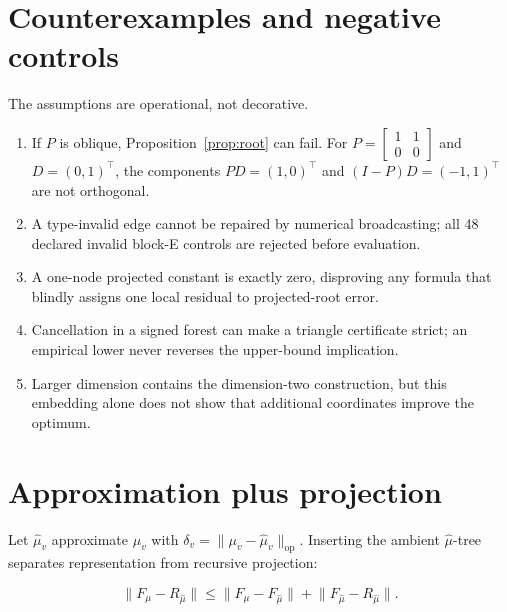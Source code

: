 \documentclass[11pt]{amsart}
\theoremstyle{definition}
\theoremstyle{remark}
\newcommand{\op}{\operatorname{op}}
\newcommand{\norm}[1]{\lVert#1\rVert}
\begin{document}
\section{Counterexamples and negative controls}

The assumptions are operational, not decorative.

\begin{enumerate}[leftmargin=*]
\item If \(P\) is oblique, Proposition~\ref{prop:root} can fail.  For
\(P=\begin{bmatrix}1&1\\0&0\end{bmatrix}\) and \(D=(0,1)^\top\), the
components \(PD=(1,0)^\top\) and \((I-P)D=(-1,1)^\top\) are not orthogonal.
\item A type-invalid edge cannot be repaired by numerical broadcasting; all
48 declared invalid block-E controls are rejected before evaluation.
\item A one-node projected constant is exactly zero, disproving any formula
that blindly assigns one local residual to projected-root error.
\item Cancellation in a signed forest can make a triangle certificate strict;
an empirical lower never reverses the upper-bound implication.
\item Larger dimension contains the dimension-two construction, but this
embedding alone does not show that additional coordinates improve the optimum.
\end{enumerate}

\begin{table}[p]
\centering\small
\caption{Failure and counterexample registry.  Open scientific questions are retained as blockers.}
\label{tab:failures}
\resizebox{.94\textwidth}{!}{}
\end{table}

\section{Approximation plus projection}

Let \(\widehat\mu_v\) approximate \(\mu_v\) with
\(\delta_v=\norm{\mu_v-\widehat\mu_v}_{\op}\).  Inserting the ambient
\(\widehat\mu\)-tree separates representation from recursive projection:

\[
 \norm{F_\mu-R_{\widehat\mu}}
 \le\norm{F_\mu-F_{\widehat\mu}}
    +\norm{F_{\widehat\mu}-R_{\widehat\mu}}.
\]
\end{document}

